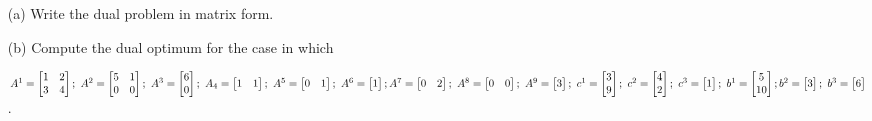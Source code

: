 \begin{itemize}
	\item[(a)] Write the dual problem in matrix form.
	\item[(b)] Compute the dual optimum for the case in which
	
	$
	A^1 = 
	\begin{bmatrix}
		1 & 2 \\
		3 & 4
	\end{bmatrix}  ; \ 
	A^2 = 
	\begin{bmatrix}
		5 & 1 \\
		0 & 0
	\end{bmatrix}  ; \ 
	A^3 = 
	\begin{bmatrix}
		6 \\
		0
	\end{bmatrix}  ; \ 
	A_4 = 
	\begin{bmatrix}
		1 & 1
	\end{bmatrix}  ; \ 
	A^5 = 
	\begin{bmatrix}
		0 & 1
	\end{bmatrix}  ; \ 
	A^6 = 
	\begin{bmatrix}
		1
	\end{bmatrix}  ; \\ 
	A^7 = 
	\begin{bmatrix}
		0 & 2
	\end{bmatrix}  ; \ 
	A^8 = 
	\begin{bmatrix}
		0 & 0
	\end{bmatrix}  ; \ 
	A^9 = 
	\begin{bmatrix}
		3
	\end{bmatrix}  ; \ 
	c^1 = 
	\begin{bmatrix}
		3 \\
		9
	\end{bmatrix}  ; \ 
	c^2 = 
	\begin{bmatrix}
		4 \\
		2
	\end{bmatrix}  ; \ 
	c^3 = 
	\begin{bmatrix}
		1
	\end{bmatrix}  ; \ 
	b^1 = 
	\begin{bmatrix}
		5 \\
		10
	\end{bmatrix}  ; \\ 
	b^2 = 
	\begin{bmatrix}
		3 
	\end{bmatrix}  ; \ 
	b^3 =
	\begin{bmatrix}
		6
	\end{bmatrix}
	$
	.
		
\end{itemize}
